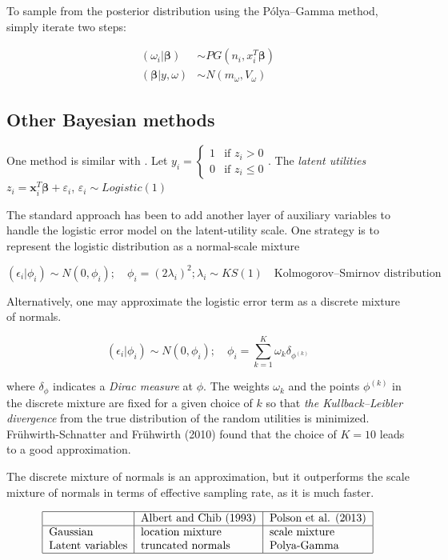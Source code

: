 \documentclass[12pt]{article}
\begin{document}
To sample from the posterior distribution using the Pólya--Gamma method,
simply iterate two steps:

\[\begin{aligned}
(\omega_i|\boldsymbol{\beta})&\sim PG(n_i,x_i^T\boldsymbol{\beta})\\
(\boldsymbol{\beta}|y,\omega)&\sim N(m_\omega,V_\omega)
\end{aligned}\]

\hypertarget{other-bayesian-methods}{%
\subsection{Other Bayesian methods}\label{other-bayesian-methods}}

One method is similar with \citet{albertBayesianAnalysisBinary1993}. Let
\(y_i=\begin{cases}1&\text{if } z_i>0\\0&\text{if }z_i\le0\end{cases}\).
The \emph{latent utilities}
\(z_i=\mathbf{x}_i^T\boldsymbol{\beta}+\varepsilon_i\),
\(\varepsilon_i\sim Logistic(1)\)

The standard approach has been to add another layer of auxiliary
variables to handle the logistic error model on the latent-utility
scale. One strategy is to represent the logistic distribution as a
normal-scale mixture

\[(\epsilon_i|\phi_i)\sim N(0,\phi_i);\quad \phi_i=(2\lambda_i)^2; \lambda_i\sim KS(1)\quad\text{Kolmogorov–Smirnov distribution}\]

Alternatively, one may approximate the logistic error term as a discrete
mixture of normals.

\[(\epsilon_i|\phi_i)\sim N(0,\phi_i);\quad \phi_i=\sum_{k=1}^K\omega_k\delta_{\phi^{(k)}}\]

where \(\delta_{\phi}\) indicates a {\emph{Dirac measure}} at \(\phi\).
The weights \(\omega_k\) and the points \(\phi^{(k)}\) in the discrete
mixture are fixed for a given choice of \(k\) so that \emph{{the
Kullback--Leibler divergence}} from the true distribution of the random
utilities is minimized. Frühwirth-Schnatter and Frühwirth (2010) found
that the choice of \(K=10\) leads to a good approximation.

The discrete mixture of normals is an approximation, but it outperforms
the scale mixture of normals in terms of effective sampling rate, as it
is much faster.

\[\begin{tabular}{|l|l|l|}\hline
                 & {Albert and Chib (1993)} & Polson et al. (2013) \\\hline
{Gaussian}         & location mixture  & scale mixture \\
{Latent variables} & truncated normals & Polya-Gamma \\\hline
\end{tabular}\]
\end{document}
